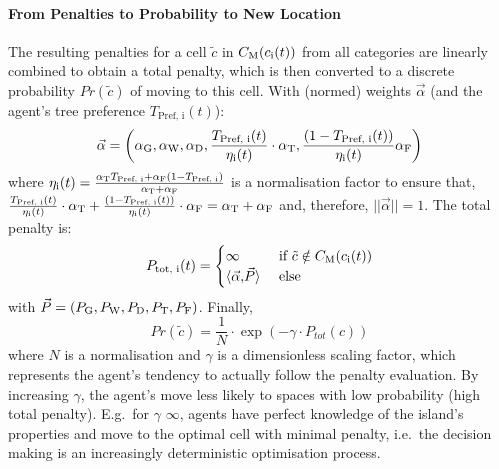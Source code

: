 \paragraph{From Penalties to Probability to New Location}
The resulting penalties for a cell  $\tilde{c}$ in $C_{\rm M}(c_{\rm i}(t))$ from all categories are linearly combined to obtain a total penalty, which is then converted to a discrete probability $Pr(\tilde{c})$ of moving to this cell.
With (normed) weights $\vec{\alpha}$ (and the agent's tree preference $T_\text{Pref, i}(t)$):
\begin{equation}\label{eq:vecalpha}
\vec{\alpha} = \left(\alpha_{\rm G},  \alpha_{\rm W}, \alpha_{\rm D},  \frac{T_\text{Pref, i}(t)}{\eta_{\rm i}(t)} \cdot \alpha_{\rm T}, \frac{(1-T_\text{Pref, i}(t))}{\eta_{\rm i}(t)} \alpha_{\rm F}\right)
\end{equation} 
where $\eta_{\rm i}(t) = \frac{\alpha_{\rm T} T_\text{Pref, i}+ \alpha_{\rm F} (1-T_\text{Pref, i})}{\alpha_{\rm T}+\alpha_{\rm F}}$ is a normalisation factor to ensure that, $\frac{T_\text{Pref, i}(t)}{\eta_{\rm i}(t)}\cdot \alpha_{\rm T} + \frac{(1-T_\text{Pref, i}(t))}{\eta_{\rm i}(t)} \cdot \alpha_{\rm F} = \alpha_{\rm T}+ \alpha_{\rm F}$ and, therefore, $||\vec{\alpha}||=1$. 
The total penalty is:
\begin{equation}
P_\text{tot, i}(t) =  \begin{cases} \infty & \text{ if } \tilde{c}\notin C_{\rm M}(c_{\rm i}(t))\\
	 \langle \vec{\alpha}{, } \vec{P} \rangle &  \text{ else}
	 \end{cases}
\end{equation}
with $\vec{P} = (P_{\rm G}, P_{\rm W}, P_{\rm D}, P_{\rm T}, P_{\rm F})$.
Finally, 
\begin{equation}
	Pr(\tilde{c})  = \frac{1}{N} \cdot \exp \left( - \gamma \cdot P_{tot}(c) \right) 
\end{equation}
where $N$ is a normalisation and $\gamma$ is a dimensionless scaling factor, which represents the agent's tendency to actually follow the penalty evaluation. 
By increasing $\gamma$, the agent's move less likely to spaces with low probability (high total penalty). 
E.g.\ for $\gamma$ \ra $\infty$, agents have perfect knowledge of the island's properties and move to the optimal cell with minimal penalty, i.e.\ the decision making is an increasingly deterministic optimisation process\footnotemark.
